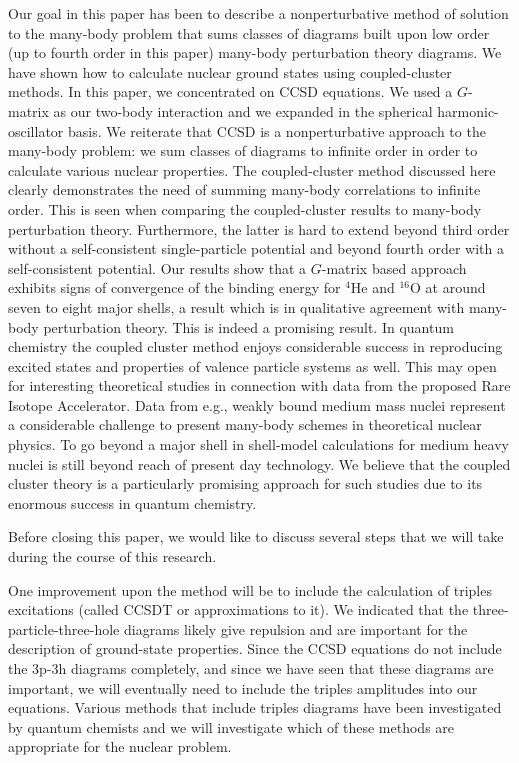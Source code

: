 \documentclass[aps,prc,twocolumn,floatfix]{revtex4}
\begin{document}
Our goal in this paper has been to describe a nonperturbative method of 
solution to the many-body problem that sums classes of diagrams built upon
low order (up to fourth order in this paper) many-body perturbation theory
diagrams. We have shown how to calculate nuclear ground states using 
coupled-cluster methods. In this paper, 
we concentrated on CCSD equations. 
We used a $G$-matrix as our two-body interaction and 
we expanded in the spherical harmonic-oscillator basis. We reiterate that
CCSD is a nonperturbative approach to the many-body problem: we sum 
classes of diagrams to infinite order in order to calculate various
nuclear properties.  The coupled-cluster method discussed here 
clearly demonstrates the need of summing 
many-body correlations to infinite order. 
This is seen when comparing the coupled-cluster results to many-body 
perturbation theory. Furthermore, the latter
is hard to extend beyond third order  
without a self-consistent single-particle potential and beyond 
fourth order with a self-consistent potential.  
Our results show that a $G$-matrix based approach exhibits signs of convergence
of the binding energy for $^{4}$He and $^{16}$O at around seven to eight
major shells, a result which is in qualitative agreement with many-body
perturbation theory. This is indeed a promising result. 
In quantum chemistry the coupled cluster method enjoys considerable success
in reproducing excited states and properties of valence particle systems as well.
This may open for interesting theoretical studies in connection with data
from the proposed Rare Isotope Accelerator. Data from e.g., weakly bound
medium mass nuclei represent a considerable challenge to present many-body
schemes in theoretical nuclear physics.
To go beyond a major shell in shell-model
calculations for medium heavy  nuclei is
still beyond reach of present day  technology. We believe that 
the coupled cluster theory is a particularly promising approach for such 
studies due to its enormous success in quantum chemistry.

Before closing
this paper, we would like to discuss several steps that we will take 
during the course of this research. 

One improvement upon the method will be to include the calculation of 
triples excitations (called CCSDT or approximations to it). We indicated 
that the three-particle-three-hole diagrams likely give repulsion and are
important for the description of ground-state properties. Since the CCSD
equations do not include the 3p-3h diagrams completely, and since we have
seen that these diagrams are important, we will eventually need to 
include the triples amplitudes into our equations. Various methods
that include triples diagrams have been investigated by quantum 
chemists and we will investigate which of these methods are appropriate
for the nuclear problem. 
\end{document}
